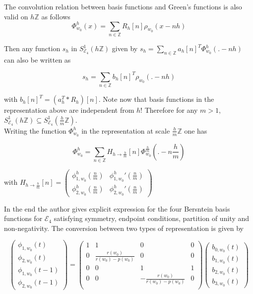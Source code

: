 \documentclass[a4paper, 11pt]{article}
\begin{document}
The convolution relation between basis functions and Green's functions is also valid on $h\mathbb{Z}$ as follows
\begin{equation}
  \Phi^h_{w_0}(x) = \sum_{n \in \mathbb{Z}} R_h[n] \rho_{w_0}(x-nh)
\end{equation}

Then any function $s_h$ in $S^1_{\mathcal{E}_4}(h\mathbb{Z})$ given by $s_h = \sum_{n \in \mathbb{Z}} {a_h[n]}^T
\Phi^h_{w_0}(.-nh)$ can also be written as

\begin{equation}
  s_h = \sum_{n \in \mathbb{Z}} {b_h[n]}^T \rho_{w_0}(.-nh)
\end{equation}

with ${b_h[n]}^T = (a_h^T * R_h)[n]$. Note now that basis functions in the representation above are independent from 
$h$! Therefore for any $m > 1$, $S^1_{\mathcal{E}_4}(h\mathbb{Z}) \subseteq S^1_{\mathcal{E}_4}(\frac{h}{m}\mathbb{Z})$.  
\\

Writing the function $\Phi^h_{w_0}$ in the representation at scale $\frac{h}{m} \mathbb{Z}$ one has

\begin{equation}
  \Phi^h_{w_0} = \sum_{n \in \mathbb{Z}} H_{h \to \frac{h}{m}}[n] \Phi^{\frac{h}{m}}_{w_0}(.-n\frac{h}{m})
\end{equation}

with $H_{h \to \frac{h}{m}}[n] = \begin{pmatrix}
  \phi^h_{1, w_0}(\frac{n}{m}) & {\phi^{h}_{1, w_0}}'(\frac{n}{m})  \\
  \phi^h_{2, w_0}(\frac{n}{m}) & {\phi^{h}_{2, w_0}}'(\frac{n}{m})
\end{pmatrix}$

In the end the author gives explicit expression for the four Bersntein basis functions for $\mathcal{E}_4$ satisfying 
symmetry, endpoint conditions, partition of unity and non-negativity. The conversion between two types of representation 
is given by

\begin{equation}
  \begin{pmatrix} \phi_{1, w_0}(t) \\  \phi_{2, w_0}(t) \\ \phi_{1, w_0}(t-1) \\ \phi_{2, w_0}(t-1) \end{pmatrix}
  =
  \begin{pmatrix}
  1 & 1 & 0 & 0 \\
  0 & \frac{r(w_0)}{r(w_0)-p(w_0)} & 0 & 0 \\
  0 & 0 & 1 & 1 \\
  0 & 0 & - \frac{r(w_0)}{r(w_0)-p(w_0)} & 0 \\
  \end{pmatrix}
  \begin{pmatrix} b_{0, w_0}(t) \\ b_{1, w_0}(t) \\ b_{2, w_0}(t)  \\ b_{3, w_0}(t) \end{pmatrix}
\end{equation}
\end{document}
